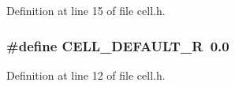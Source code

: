 Definition at line 15 of file cell.h.

\subsubsection[{CELL\_\-DEFAULT\_\-R}]{\setlength{\rightskip}{0pt plus 5cm}\#define CELL\_\-DEFAULT\_\-R~0.0}\label{cell_8h_a27fff0095df1dabbe4be93fe2f8103b8}


Definition at line 12 of file cell.h.


